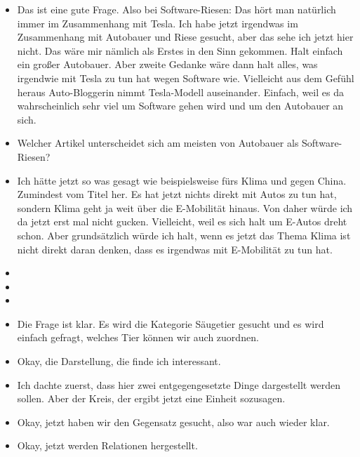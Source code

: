 {\begin{itemize}[]
            \item {} Das ist eine gute Frage.
                  Also bei Software-Riesen: Das hört man natürlich immer im Zusammenhang mit Tesla.
                  Ich habe jetzt irgendwas im Zusammenhang mit Autobauer und Riese gesucht, aber das sehe ich jetzt hier nicht.
                  Das wäre mir nämlich als Erstes in den Sinn gekommen.
                  Halt einfach ein großer Autobauer.
                  Aber zweite Gedanke wäre dann halt alles, was irgendwie mit Tesla zu tun hat wegen Software wie.
                  Vielleicht aus dem Gefühl heraus \flqq Auto-Bloggerin nimmt Tesla-Modell auseinander\frqq{}.
                  Einfach, weil es da wahrscheinlich sehr viel um Software gehen wird und um den Autobauer an sich.
            \item {} Welcher Artikel unterscheidet sich am meisten von \flqq Autobauer als Software-Riesen\frqq{}?
            \item {} Ich hätte jetzt so was gesagt wie beispielsweise \flqq fürs Klima und gegen China\frqq{}.
                  Zumindest vom Titel her.
                  Es hat jetzt nichts direkt mit Autos zu tun hat, sondern Klima geht ja weit über die E-Mobilität hinaus.
                  Von daher würde ich da jetzt erst mal nicht gucken.
                  Vielleicht, weil es sich halt um E-Autos dreht schon.
                  Aber grundsätzlich würde ich halt, wenn es jetzt das Thema Klima ist nicht direkt daran denken, dass es irgendwas mit E-Mobilität zu tun hat.
            \item {}
            \item {}
            \item {}
            \item {} Die Frage ist klar.
                  Es wird die Kategorie Säugetier gesucht und es wird einfach gefragt, welches Tier können wir auch zuordnen.
            \item {} Okay, die Darstellung, die finde ich interessant.
            \item {} Ich dachte zuerst, dass hier zwei entgegengesetzte Dinge dargestellt werden sollen. Aber der Kreis, der ergibt jetzt eine Einheit sozusagen.
            \item {} Okay, jetzt haben wir den Gegensatz gesucht, also war auch wieder klar.
            \item {} Okay, jetzt werden Relationen hergestellt.

\end{itemize}}
